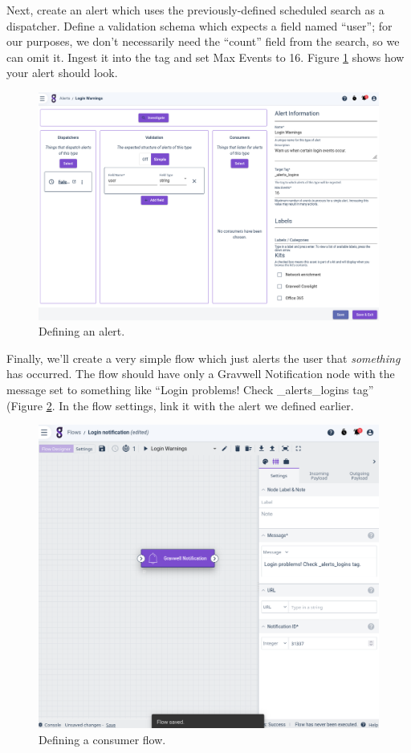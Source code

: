 Next, create an alert which uses the previously-defined scheduled search as a dispatcher. Define a validation schema which expects a field named ``user''; for our purposes, we don't necessarily need the ``count'' field from the search, so we can omit it. Ingest it into the tag  and set Max Events to 16. Figure \ref{fig:alert-lab-alert} shows how your alert should look.

\begin{figure}
	\includegraphics[width=0.85\linewidth]{images/alert-lab-alert.png}
	\caption{Defining an alert.}
	\label{fig:alert-lab-alert}
\end{figure}

Finally, we'll create a very simple flow which just alerts the user that \emph{something} has occurred. The flow should have only a Gravwell Notification node with the message set to something like ``Login problems! Check \_alerts\_logins tag'' (Figure \ref{fig:alert-lab-flow}. In the flow settings, link it with the alert we defined earlier.

\begin{figure}
	\includegraphics[width=0.85\linewidth]{images/alert-lab-flow.png}
	\caption{Defining a consumer flow.}
	\label{fig:alert-lab-flow}
\end{figure}

